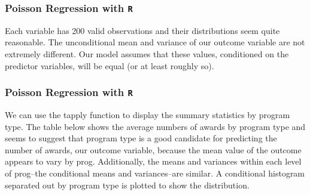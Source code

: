 \documentclass[00-GLMregslides.tex]{subfiles}
\begin{document}
\begin{frame}[fragile]

\frametitle{Poisson Regression with \texttt{R}}
\Large

Each variable has 200 valid observations and their distributions seem quite reasonable. The unconditional mean and variance of our outcome variable are not extremely different. Our model assumes that these values, conditioned on the predictor variables, will be equal (or at least roughly so).
\end{frame}
\begin{frame}[fragile]
	
	\frametitle{Poisson Regression with \texttt{R}}
We can use the tapply function to display the summary statistics by program type. The table below shows the average numbers of awards by program type and seems to suggest that program type is a good candidate for predicting the number of awards, our outcome variable, because the mean value of the outcome appears to vary by prog. Additionally, the means and variances within each level of prog--the conditional means and variances--are similar. A conditional histogram separated out by program type is plotted to show the distribution.

\end{frame}
\end{document}
